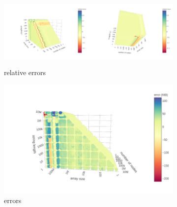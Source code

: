 \documentclass{article}
\begin{document}
\begin{figure}
  \centering
  \begin{subfigure}[t]{\textwidth}
    \centering
    \includegraphics[width=0.5\textwidth]{../local_experiments/io_memory_tests/plots/prediction_relative1.png}\includegraphics[width=0.5\textwidth]{../local_experiments/io_memory_tests/plots/prediction_relative2.png}
    \caption{relative errors}
  \end{subfigure}
  \begin{subfigure}[t]{0.49\textwidth}
    \centering
    \includegraphics[width=\textwidth]{../local_experiments/io_memory_tests/plots/prediction_errors.png}
    \caption{errors}
    \label{fig:prediction_error_b}
  \end{subfigure}
  \begin{subfigure}[t]{0.49\textwidth}
    \centering

\end{subfigure}
\end{figure}
\end{document}
